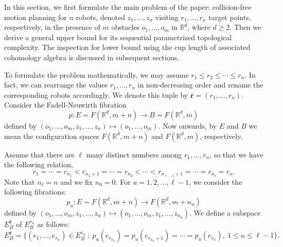 \documentclass[12pt,oneside,reqno]{amsart}
\theoremstyle{plain}
\theoremstyle{definition}
\theoremstyle{remark}
\newcommand{\rr}{{\mathbb {R}}}
\newcommand{\br}{\bar{\mathbf{r}}}
\begin{document}
In this section, we first formulate the main problem of the paper: collision-free motion planning for $n$ robots, denoted $z_1, \dots, z_n$ visiting $r_1, \dots, r_n$ target points, respectively, in the presence of $m$ obstacles $o_1, \dots, o_m$ in $\mathbb{R}^d$, where $d \geq 2$. Then we derive a general upper bound for its sequential parametrized topological complexity. The inspection for lower bound using the cup length of associated cohomology algebra is discussed in subsequent sections.

To formulate the problem mathematically, we may assume $r_1 \leq r_2 \leq \cdots \leq r_n$. In fact, we can rearrange the values $r_1, \dots, r_n$ in non-decreasing order and rename the corresponding robots accordingly. We denote this tuple by $\br = (r_1,\dots , r_n)$. 
Consider the Fadell-Neuwirth fibration 
\begin{equation}\label{Eq_FNB}
p:E = F(\mathbb{R}^d, m+n) \to B = F(\mathbb{R}^d,m) 
\end{equation}
defined by $(o_1, \dots, o_m, z_1, \dots , z_n) \mapsto (o_1, \dots, o_m).$ Now onwards, by $E$ and $B$ we mean the configuration spaces $F(\mathbb{R}^d, m+n)$ and $F(\mathbb{R}^d,m) $, respectively.

Assume that there are $\ell$ many distinct numbers among  $r_1, \dots, r_n$, so that we have the following relation, $$r_1 = \cdots = r_{n_1}< r_{n_1+1} =  \cdots = r_{n_2}<\cdots < r_{n_{\ell-1}+1} = \cdots =r_{n_\ell}= r_{n}.$$ Note that $n_{\ell} = n$ and we fix $n_0= 0$.
For $u=1, 2, \ldots, \ell-1$, we consider the following fibrations:
\begin{equation}\label{Eq_pu}
p_{u}\colon E = F(\rr^d, m+n)\to F(\rr^d, m+n_u)
\end{equation}
defined by $(o_1, \dots, o_m, z_1, \dots, z_n) \mapsto (o_1, \dots, o_m, z_1, \dots, z_{n_u})$.
We define a subspace $E^{\br}_B$ of $E^{r_n}_B$ as follows: 
\begin{equation}\label{Eq_description of total space}
E^{\br}_B=\Big\{ (e_1,\ldots,e_{r_n})\in E^{r_n}_B ~:~ p_{u}(e_{r_{n_u}}) = p_{u}(e_{r_{n_u}+1})= \cdots = p_{u}(e_{r_n}),  ~ 1\leq u \leq \ell-1 \Big\}.
\end{equation}
\end{document}
